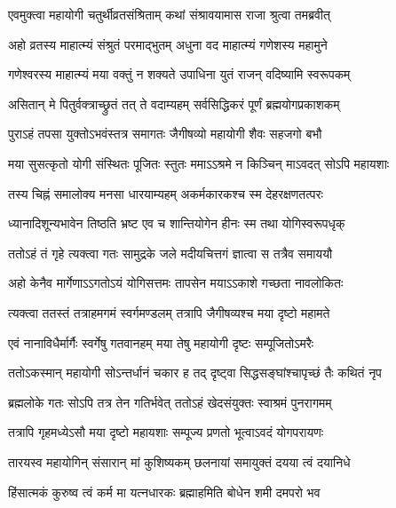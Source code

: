 \twolineshloka
{एवमुक्त्वा महायोगी चतुर्थीव्रतसंश्रिताम्}
{कथां संश्रावयामास राजा श्रुत्वा तमब्रवीत्} %


\twolineshloka
{अहो व्रतस्य माहात्म्यं संश्रुतं परमाद्भुतम्}
{अधुना वद माहात्म्यं गणेशस्य महामुने} %


\twolineshloka
{गणेश्वरस्य माहात्म्यं मया वक्तुं न शक्यते}
{उपाधिना युतं राजन् वदिष्यामि स्वरूपकम्} %

\twolineshloka
{असितान् मे पितुर्वक्त्राच्छ्रुतं तत् ते वदाम्यहम्}
{सर्वसिद्धिकरं पूर्णं ब्रह्मयोगप्रकाशकम्} %

\twolineshloka
{पुराऽहं तपसा युक्तोऽभवंस्तत्र समागतः}
{जैगीषव्यो महायोगी शैवः सहजगो बभौ} %

\twolineshloka
{मया सुसत्कृतो योगी संस्थितः पूजितः स्तुतः}
{ममाऽऽश्रमे न किञ्चिन् माऽवदत् सोऽपि महायशाः} %

\twolineshloka
{तस्य चिह्नं समालोक्य मनसा धारयाम्यहम्}
{अकर्मकारकश्च स्म देहरक्षणतत्परः} %

\twolineshloka
{ध्यानादिशून्यभावेन तिष्ठति भ्रष्ट एव च}
{शान्तियोगेन हीनः स्म तथा योगिस्वरूपधृक्} %

\twolineshloka
{ततोऽहं तं गृहे त्यक्त्वा गतः सामुद्रके जले}
{मदीयचित्तगं ज्ञात्वा स तत्रैव समाययौ} %

\twolineshloka
{अहो केनैव मार्गेणाऽऽगतोऽयं योगिसत्तमः}
{तापसेन मयाऽऽकाशे गच्छता नावलोकितः} %

\twolineshloka
{त्यक्त्वा ततस्तं तत्राहमगमं स्वर्गमण्डलम्}
{तत्रापि जैगीषव्यश्च मया दृष्टो महामते} %

\twolineshloka
{एवं नानाविधैर्मार्गैः स्वर्गेषु गतवानहम्}
{मया तेषु महायोगी दृष्टः सम्पूजितोऽमरैः} %

\twolineshloka
{ततोऽकस्मान् महायोगी सोऽन्तर्धानं चकार ह}
{तद् दृष्ट्वा सिद्धसङ्घांश्चापृच्छं तैः कथितं नृप} %

\twolineshloka
{ब्रह्मलोके गतः सोऽपि तत्र तेन गतिर्भवेत्}
{ततोऽहं खेदसंयुक्तः स्वाश्रमं पुनरागमम्} %

\twolineshloka
{तत्रापि गृहमध्येऽसौ मया दृष्टो महायशाः}
{सम्पूज्य प्रणतो भूत्वाऽवदं योगपरायणः} %

\twolineshloka
{तारयस्व महायोगिन् संसारान् मां कुशिष्यकम्}
{छलनायां समायुक्तं दयया त्वं दयानिधे} %


\twolineshloka
{हिंसात्मकं कुरुष्व त्वं कर्म मा यत्नधारकः}
{ब्रह्माहमिति बोधेन शमी दमपरो भव} %


